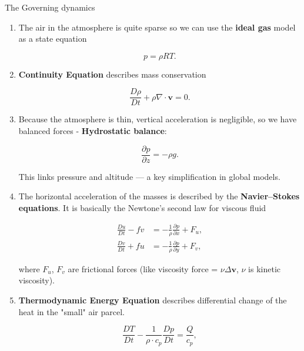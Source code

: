 \documentclass[10pt]{beamer}
\begin{document}
	\begin{frame}{The Governing dynamics}
		
		\begin{enumerate}
			\item<only@1> The air in the atmosphere is quite sparse so we can use the \textbf{ideal gas} model as a state equation
			
			\begin{equation}
				p = \rho R T.
			\end{equation}
			
			\item<only@1> \textbf{Continuity Equation} describes mass conservation
			
			\begin{equation}
				\frac{D\rho}{Dt} + \rho \nabla \cdot \mathbf{v} = 0.
			\end{equation}
			
			\item<only@1> Because the atmosphere is thin, vertical acceleration is negligible, so we have balanced forces - \textbf{Hydrostatic balance}:
			
			\begin{equation}
				\frac{\partial p}{\partial z} = -\rho g.
			\end{equation}
			
			This links pressure and altitude — a key simplification in global models.
			
			\item<only@2> The horizontal acceleration of the masses is described by the \textbf{Navier–Stokes equations}. It is basically the Newtone's second law for viscous fluid
			
			\begin{align}
				\frac{Du}{Dt} - fv &= -\frac{1}{\rho} \frac{\partial p}{\partial x} + F_u, \\
				\frac{Dv}{Dt} + fu &= -\frac{1}{\rho} \frac{\partial p}{\partial y} + F_v,
			\end{align}
			
			where $F_u$, $F_v$ are frictional forces (like viscosity force = $\nu \Delta \boldsymbol{v}$, $\nu$ is kinetic viscosity).
			
			\item<only@2> \textbf{Thermodynamic Energy Equation} describes differential change of the heat in the "small" air parcel.
			
			\begin{equation}
				\frac{DT}{Dt} - \frac{1}{\rho \cdot c_p} \frac{Dp}{Dt} = \frac{Q}{c_p},
			\end{equation}
			

\end{enumerate}
\end{frame}
\end{document}
